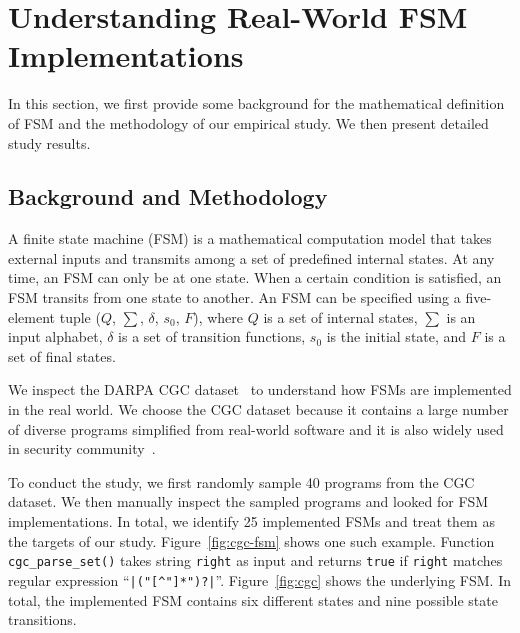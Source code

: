\section{Understanding Real-World FSM Implementations}
\label{sec:study}

In this section, we first provide some background 
for the mathematical definition of FSM and 
the methodology of our empirical study. 
We then present detailed study results. 


\subsection{Background and Methodology}






A finite state machine (FSM) is a mathematical computation model
that takes external inputs and transmits among a set of predefined internal states. 
At any time, an FSM can only be at one state.
When a certain condition is satisfied,
an FSM transits from one state to another.
An FSM can be specified using a five-element tuple ($Q$, $\sum$, $\delta$, $s_0$, $F$),
where $Q$ is a set of internal states, $\sum$ is an input alphabet,
$\delta$ is a set of transition functions,
$s_0$ is the initial state, and $F$ is 
a set of final states.

We inspect the DARPA CGC dataset~\cite{CGC} to
understand how FSMs are implemented in the real world.
We choose the CGC dataset because it
contains a large number of diverse programs simplified
from real-world software and it
is also widely used in security
community~\cite{QSYM, Driller, VUzzer}.






To conduct the study, we first randomly sample
40 programs from the CGC dataset.
We then manually inspect the sampled programs and looked for 
FSM implementations.
In total, we identify 25 implemented FSMs
and treat them as the targets of our study.
Figure~\ref{fig:cgc-fsm} shows one such example.
Function \texttt{cgc\_parse\_set()} takes string \texttt{right}
as input and returns \texttt{true} if \texttt{right} matches
regular expression ``\verb/|("[^"]*")?|/''.
Figure~\ref{fig:cgc} shows the underlying FSM.
In total, the implemented FSM contains six different states
and nine possible state transitions.



